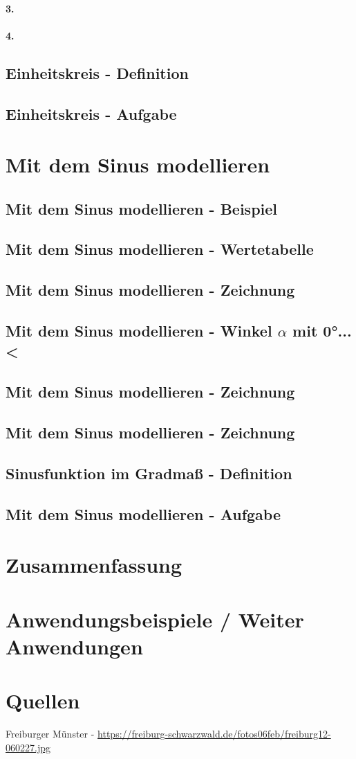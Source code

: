 \documentclass[12pt,a4paper]{article}
\begin{document}
\paragraph{3.}
\paragraph{4.}
\subsection{Einheitskreis - Definition}
\subsection{Einheitskreis - Aufgabe}

\section{Mit dem Sinus modellieren}
\subsection{Mit dem Sinus modellieren - Beispiel}
\subsection{Mit dem Sinus modellieren - Wertetabelle}
\subsection{Mit dem Sinus modellieren - Zeichnung}

\subsection{Mit dem Sinus modellieren - Winkel $\alpha$ mit 0°...<}
\subsection{Mit dem Sinus modellieren - Zeichnung}
\subsection{Mit dem Sinus modellieren - Zeichnung}

\subsection{Sinusfunktion im Gradmaß - Definition}
\subsection{Mit dem Sinus modellieren - Aufgabe}

\section{Zusammenfassung}

\section{Anwendungsbeispiele / Weiter Anwendungen}

\section{Quellen}
Freiburger Münster - \url{https://freiburg-schwarzwald.de/fotos06feb/freiburg12-060227.jpg}
\end{document}
